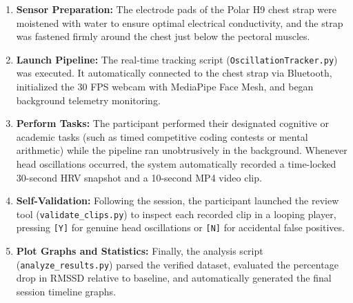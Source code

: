 \documentclass[12pt,a4paper,oneside]{report}
\begin{document}
\begin{enumerate}[leftmargin=1.5cm, label=\textbf{Step \arabic*:}]
    \item \textbf{Sensor Preparation:} The electrode pads of the Polar H9 chest strap were moistened with water to ensure optimal electrical conductivity, and the strap was fastened firmly around the chest just below the pectoral muscles.
    
    \item \textbf{Launch Pipeline:} The real-time tracking script (\texttt{OscillationTracker.py}) was executed. It automatically connected to the chest strap via Bluetooth, initialized the 30 FPS webcam with MediaPipe Face Mesh, and began background telemetry monitoring.
    
    \item \textbf{Perform Tasks:} The participant performed their designated cognitive or academic tasks (such as timed competitive coding contests or mental arithmetic) while the pipeline ran unobtrusively in the background. Whenever head oscillations occurred, the system automatically recorded a time-locked 30-second HRV snapshot and a 10-second MP4 video clip.
    
    \item \textbf{Self-Validation:} Following the session, the participant launched the review tool (\texttt{validate\_clips.py}) to inspect each recorded clip in a looping player, pressing \texttt{[Y]} for genuine head oscillations or \texttt{[N]} for accidental false positives.
    
    \item \textbf{Plot Graphs and Statistics:} Finally, the analysis script (\texttt{analyze\_results.py}) parsed the verified dataset, evaluated the percentage drop in RMSSD relative to baseline, and automatically generated the final session timeline graphs.
\end{enumerate}
\end{document}

